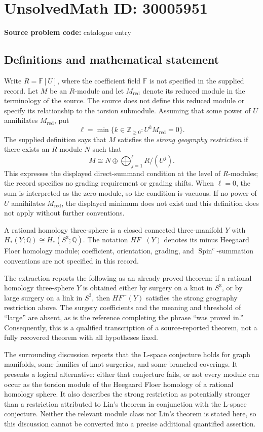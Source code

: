 \documentclass[11pt]{article}
\newcommand{\Z}{\mathbb{Z}}
\newcommand{\Q}{\mathbb{Q}}
\newcommand{\F}{\mathbb{F}}
\begin{document}
\section*{UnsolvedMath ID: 30005951}
\textbf{Source problem code:} catalogue entry
\subsection{Definitions and mathematical statement}
Write \(R=\F[U]\), where the coefficient field \(\F\) is not specified in the supplied record. Let \(M\) be an \(R\)-module and let \(M_{\mathrm{red}}\) denote its reduced module in the terminology of the source. The source does not define this reduced module or specify its relationship to the torsion submodule. Assuming that some power of \(U\) annihilates \(M_{\mathrm{red}}\), put
\[
\ell=\min\{k\in\Z_{\geq 0}:U^kM_{\mathrm{red}}=0\}.
\]
The supplied definition says that \(M\) satisfies the \emph{strong geography restriction} if there exists an \(R\)-module \(N\) such that
\[
M\cong N\oplus\bigoplus_{j=1}^{\ell}R/(U^j).
\]
This expresses the displayed direct-summand condition at the level of \(R\)-modules; the record specifies no grading requirement or grading shifts. When \(\ell=0\), the sum is interpreted as the zero module, so the condition is vacuous. If no power of \(U\) annihilates \(M_{\mathrm{red}}\), the displayed minimum does not exist and this definition does not apply without further conventions.

A rational homology three-sphere is a closed connected three-manifold \(Y\) with \(H_*(Y;\Q)\cong H_*(S^3;\Q)\). The notation \(HF^-(Y)\) denotes its minus Heegaard Floer homology module; coefficient, orientation, grading, and \(\operatorname{Spin}^c\)-summation conventions are not specified in this record.

The extraction reports the following as an already proved theorem: if a rational homology three-sphere \(Y\) is obtained either by surgery on a knot in \(S^3\), or by large surgery on a link in \(S^3\), then \(HF^-(Y)\) satisfies the strong geography restriction above. The surgery coefficients and the meaning and threshold of ``large'' are absent, as is the reference completing the phrase ``was proved in.'' Consequently, this is a qualified transcription of a source-reported theorem, not a fully recovered theorem with all hypotheses fixed.

The surrounding discussion reports that the L-space conjecture holds for graph manifolds, some families of knot surgeries, and some branched coverings. It presents a logical alternative: either that conjecture fails, or not every module can occur as the torsion module of the Heegaard Floer homology of a rational homology sphere. It also describes the strong restriction as potentially stronger than a restriction attributed to Lin's theorem in conjunction with the L-space conjecture. Neither the relevant module class nor Lin's theorem is stated here, so this discussion cannot be converted into a precise additional quantified assertion.
\end{document}
